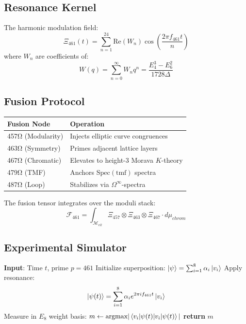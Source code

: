 \documentclass[12pt]{article}
\begin{document}
\subsection*{Resonance Kernel}
The harmonic modulation field:
\[
\Xi_{461}(t) = \sum_{n=1}^{24} \text{Re}(W_n) \cos\left(\frac{2\pi f_{461} t}{n}\right)
\]
where $W_n$ are coefficients of:
\[
W(q) = \sum_{n=0}^\infty W_n q^n = \frac{E_4^3 - E_6^2}{1728 \Delta}
\]

\subsection*{Fusion Protocol}
\begin{table}[h]
\centering
\begin{tabular}{ll}
\toprule
\textbf{Fusion Node} & \textbf{Operation} \\
\midrule
457Ω (Modularity) & Injects elliptic curve congruences \\
463Ω (Symmetry) & Primes adjacent lattice layers \\
467Ω (Chromatic) & Elevates to height-3 Morava $K$-theory \\
479Ω (TMF) & Anchors $\text{Spec}(\text{tmf})$ spectra \\
487Ω (Loop) & Stabilizes via $\Omega^\infty$-spectra \\
\bottomrule
\end{tabular}
\end{table}

\noindent The fusion tensor integrates over the moduli stack:
\[
\mathcal{F}_{461} = \int_{\mathcal{M}_{ell}} \Xi_{457} \otimes \Xi_{463} \otimes \Xi_{467} \cdot d\mu_{chrom}
\]

\subsection*{Experimental Simulator}
\begin{algorithm}[H]
\caption{Quantum Heterotic Memory Circuit}
\begin{algorithmic}[1]
\State \textbf{Input}: Time $t$, prime $p=461$
\State Initialize superposition: $\ket{\psi} = \sum_{i=1}^8 \alpha_i \ket{v_i}$
\State Apply resonance:
\[
\ket{\psi(t)} = \sum_{i=1}^8 \alpha_i e^{2\pi i f_{461} t} \ket{v_i}
\]
\State Measure in $E_8$ weight basis: $m \gets \text{argmax}|\braket{v_i|\psi(t)}|$
\State \textbf{return} $m$ 
\end{algorithmic}
\end{algorithm}
\end{document}
